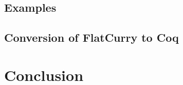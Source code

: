 \documentclass[fleqn]{scrreprt}
\newcommand{\todo}[1]{\marginpar{\textbf{TODO:} #1}}
\begin{document}
\section{Examples}
\section{Conversion of FlatCurry to Coq}
\chapter{Conclusion}

\appendix



\end{document}
